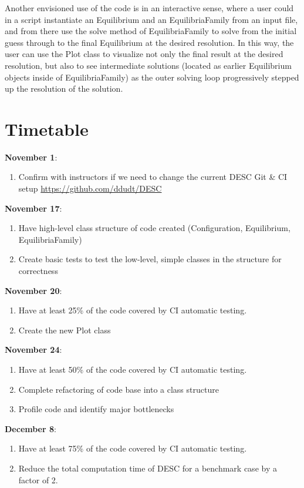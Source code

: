 \documentclass{article}
\begin{document}
Another envisioned use of the code is in an interactive sense, where a user could in a script instantiate an Equilibrium and an EquilibriaFamily from an input file, and from there use the solve method of EquilibriaFamily to solve from the initial guess through to the final Equilibrium at the desired resolution. In this way, the user can use the Plot class to visualize not only the final result at the desired resolution, but also to see intermediate solutions (located as earlier Equilibrium objects inside of EquilibriaFamily) as the outer solving loop progressively stepped up the resolution of the solution.

\section{Timetable}

\textbf{November 1}:
\begin{enumerate}
\item Confirm with instructors if we need to change the current DESC Git \& CI setup \url{https://github.com/ddudt/DESC}
\end{enumerate}
%
\textbf{November 17}:
\begin{enumerate}

\item Have high-level class structure of code created (Configuration, Equilibrium, EquilibriaFamily)
\item Create basic tests to test the low-level, simple classes in the structure for correctness

\end{enumerate}
%

\textbf{November 20}:
\begin{enumerate}
\item Have at least 25\% of the code covered by CI automatic testing.
\item Create the new Plot class
\end{enumerate}
%
\textbf{November 24}:
\begin{enumerate}
\item Have at least 50\% of the code covered by CI automatic testing.
\item Complete refactoring of code base into a class structure
\item Profile code and identify major bottlenecks
\end{enumerate}
%
\textbf{December 8}:
\begin{enumerate}
\item Have at least 75\% of the code covered by CI automatic testing.
\item Reduce the total computation time of DESC for a benchmark case by a factor of 2.
\end{enumerate}
\end{document}
